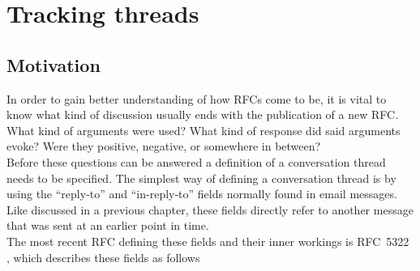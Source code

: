 \documentclass[a4paper,english]{report}
\begin{document}
\chapter{Tracking threads}

\section{Motivation}

In order to gain better understanding of how RFCs come to be, it is vital to know
what kind of discussion usually ends with the publication of a new RFC. What kind of arguments were used? What kind of response did said arguments evoke? Were they positive, negative, or somewhere in between?\\ 




Before these questions can be answered a definition of a conversation thread needs to be specified. The simplest way of defining a conversation thread is by using the “reply-to” and “in-reply-to” fields normally found in email messages.
Like discussed in a previous chapter, these fields directly refer to another message that was sent at an earlier point in time.\\

The most recent RFC defining these fields and their inner workings is RFC~5322 \cite{RFC5322}, which describes these fields as follows\\\\
\end{document}
